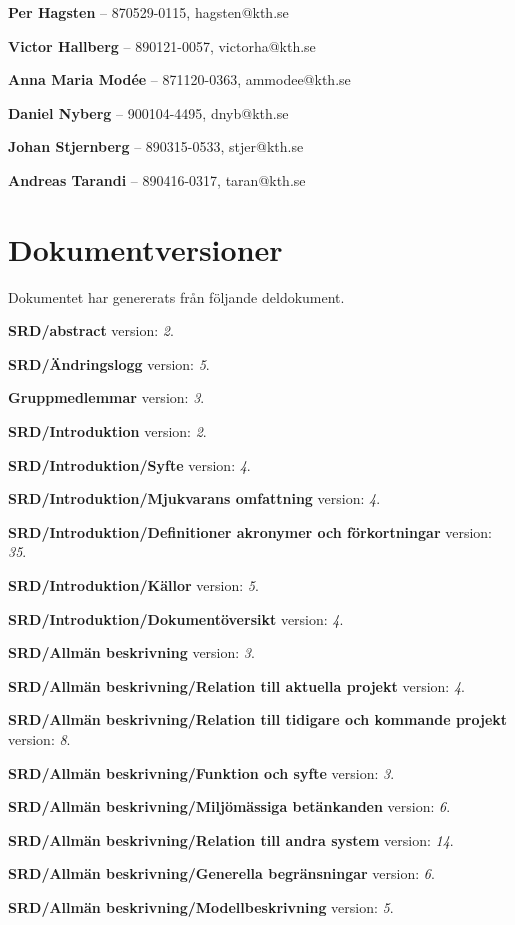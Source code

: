 \documentclass[a4paper, twoside, 11pt, titlepage]{article}
\begin{document}
\textbf{Per Hagsten} -- 870529-0115, hagsten@kth.se

\textbf{Victor Hallberg} -- 890121-0057, victorha@kth.se

\textbf{Anna Maria Modée} -- 871120-0363, ammodee@kth.se 

\textbf{Daniel Nyberg} -- 900104-4495, dnyb@kth.se 

\textbf{Johan Stjernberg} -- 890315-0533, stjer@kth.se

\textbf{Andreas Tarandi} -- 890416-0317, taran@kth.se

\clearpage
\section*{Dokumentversioner}


Dokumentet har genererats från följande deldokument.

\textbf{SRD/abstract} version: \emph{2}.

\textbf{SRD/Ändringslogg} version: \emph{5}.

\textbf{Gruppmedlemmar} version: \emph{3}.

\textbf{SRD/Introduktion} version: \emph{2}.

\textbf{SRD/Introduktion/Syfte} version: \emph{4}.

\textbf{SRD/Introduktion/Mjukvarans omfattning} version: \emph{4}.

\textbf{SRD/Introduktion/Definitioner akronymer och förkortningar} version: \emph{35}.

\textbf{SRD/Introduktion/Källor} version: \emph{5}.

\textbf{SRD/Introduktion/Dokumentöversikt} version: \emph{4}.

\textbf{SRD/Allmän beskrivning} version: \emph{3}.

\textbf{SRD/Allmän beskrivning/Relation till aktuella projekt} version: \emph{4}.

\textbf{SRD/Allmän beskrivning/Relation till tidigare och kommande projekt} version: \emph{8}.

\textbf{SRD/Allmän beskrivning/Funktion och syfte} version: \emph{3}.

\textbf{SRD/Allmän beskrivning/Miljömässiga betänkanden} version: \emph{6}.

\textbf{SRD/Allmän beskrivning/Relation till andra system} version: \emph{14}.

\textbf{SRD/Allmän beskrivning/Generella begränsningar} version: \emph{6}.

\textbf{SRD/Allmän beskrivning/Modellbeskrivning} version: \emph{5}.
\end{document}
